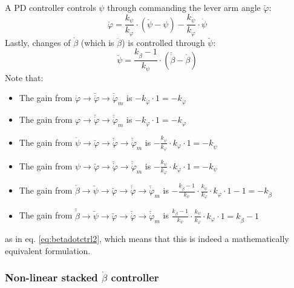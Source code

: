 \documentclass{article}
\begin{document}
A PD controller controls $\psi$ through commanding the lever arm angle $\breve{\varphi}$:
\begin{equation}
\breve{\varphi} =  \frac{k_{\psi}}{k_{\varphi}}  \cdot \left( \breve{\psi} - \psi \right) - \frac{k_{\dot{\psi}}}{k_{\varphi}} \cdot \dot{\psi}
\end{equation}
Lastly, changes of $\dot{\beta}$ (which is $\ddot{\beta}$) is controlled through $\breve{\psi}$:
\begin{equation}
\breve{\psi} = \frac{k_{\dot{\beta}} - 1}{k_{\psi}}  \cdot \left( \breve{\dot{\beta}} - \dot{\beta} \right)
\end{equation}
Note that:
\begin{itemize}
	\item The gain from $\dot{\varphi} \rightarrow \breve{\dot{\varphi}} \rightarrow \breve{\dot{\varphi}}_m$ is $-k_{\dot{\varphi}} \cdot 1 = -k_{\dot{\varphi}}$
	\item The gain from $\varphi \rightarrow \breve{\dot{\varphi}} \rightarrow \breve{\dot{\varphi}}_m$ is $-k_{\varphi} \cdot 1 = -k_{\varphi}$
	\item The gain from $\dot{\psi} \rightarrow \breve{\varphi} \rightarrow \breve{\dot{\varphi}} \rightarrow \breve{\dot{\varphi}}_m$ is $-\frac{k_{\dot{\psi}}}{k_{\varphi}} \cdot k_{\varphi} \cdot 1 = -k_{\dot{\psi}}$
	\item The gain from $\psi \rightarrow \breve{\varphi} \rightarrow \breve{\dot{\varphi}} \rightarrow \breve{\dot{\varphi}}_m$ is $-\frac{k_{\psi}}{k_{\varphi}} \cdot k_{\varphi} \cdot 1 = -k_{\psi}$
	\item The gain from $\dot{\beta} \rightarrow \breve{\psi} \rightarrow \breve{\varphi} \rightarrow \breve{\dot{\varphi}} \rightarrow \breve{\dot{\varphi}}_m$ is $-\frac{k_{\dot{\beta}} - 1}{k_{\psi}} \cdot \frac{k_{\psi}}{k_{\varphi}} \cdot k_{\varphi} \cdot 1 - 1 = -k_{\dot{\beta}}$
  \item The gain from $\breve{\dot{\beta}} \rightarrow \breve{\psi} \rightarrow \breve{\varphi} \rightarrow \breve{\dot{\varphi}} \rightarrow \breve{\dot{\varphi}}_m$ is $\frac{k_{\dot{\beta}} - 1}{k_{\psi}} \cdot \frac{k_{\psi}}{k_{\varphi}} \cdot k_{\varphi} \cdot 1= k_{\dot{\beta}} - 1$
\end{itemize}
as in eq. \ref{eq:betadotctrl2}, which means that this is indeed a mathematically equivalent formulation.

\subsubsection{Non-linear stacked  $\dot{\beta}$ controller}
\end{document}
